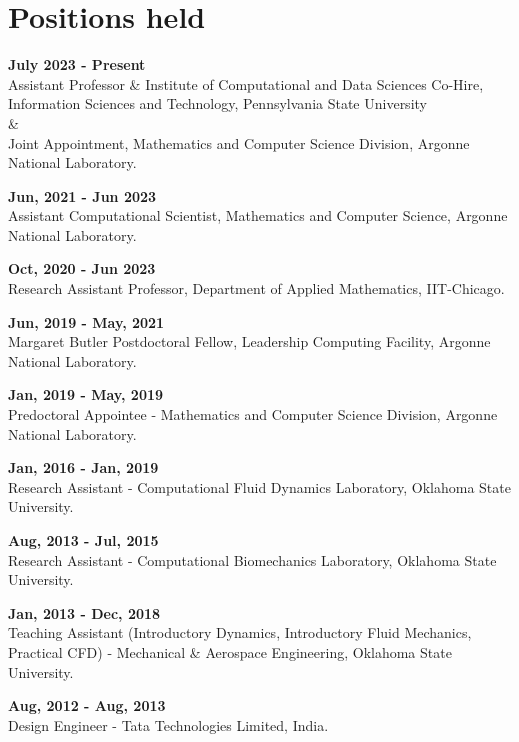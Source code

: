 \documentclass[letterpaper]{article}
\renewenvironment{itemize}{
  \begin{list}{}{
    \setlength{\leftmargin}{1.5em}
  }
}{
  \end{list}
}
\begin{document}
\section*{Positions held}
\begin{itemize}

\item  \textbf{July 2023 - Present} \\ Assistant Professor \& Institute of Computational and Data Sciences Co-Hire, Information Sciences and Technology, Pennsylvania State University \\ \& \\ Joint Appointment, Mathematics and Computer Science Division, Argonne National Laboratory.

\item  \textbf{Jun, 2021 - Jun 2023} \\ Assistant Computational Scientist, Mathematics and Computer Science, Argonne National Laboratory.

\item \textbf{Oct, 2020 - Jun 2023} \\ Research Assistant Professor, Department of Applied Mathematics, IIT-Chicago.

\item \textbf{Jun, 2019 - May, 2021} \\ Margaret Butler Postdoctoral Fellow, Leadership Computing Facility, Argonne National Laboratory.

\item \textbf{Jan, 2019 - May, 2019} \\ Predoctoral Appointee - Mathematics and Computer Science Division, Argonne National Laboratory.  

\item \textbf{Jan, 2016 - Jan, 2019} \\ Research Assistant - Computational Fluid Dynamics Laboratory, Oklahoma State University. 

\item \textbf{Aug, 2013 - Jul, 2015} \\ Research Assistant - Computational Biomechanics Laboratory, Oklahoma State University. 

\item  \textbf{Jan, 2013 - Dec, 2018} \\ Teaching Assistant (Introductory Dynamics, Introductory Fluid Mechanics, Practical CFD) - Mechanical \& Aerospace Engineering, Oklahoma State University.

\item \textbf{Aug, 2012 - Aug, 2013} \\ Design Engineer - Tata Technologies Limited, India. 
\end{itemize}
\end{document}
